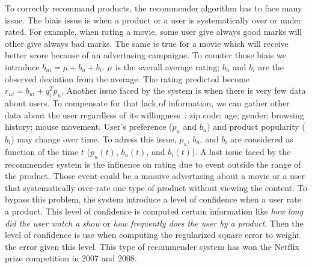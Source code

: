 \documentclass{article}
\begin{document}
To correctly recommand products, the recommender algorithm
has to face many issue. The biais issue is when a
product or a user is systematically over or under
rated. For example, when rating a movie, some user
give always good marks will other give always bad
marks. The same is true for a movie which will
receive better score because of an advertasing
campaigne. To counter those biais we introduce
$b_{ui} = \mu + b_{u} + b_{i}$. $\mu$ is the
overall average rating; $b_{u}$ and $b_{i}$ are
the observed deviation from the average. The
rating predicted become $r_{ui} = b_{ui} + q_{i}^{T} p_{u}$.
Another issue faced by the system is when there is
very few data about users. To compensate for that
lack of information, we can gather other
data about the user regardless of its
willingness~: zip code; age; gender; browsing
history; mouse movement.
User's preference ($p_{u}$ and $b_{u}$) and
product popularity ($b_{i}$) may change over
time. To adress this issue, $p_{u}$, $b_{u}$, and
$b_{i}$ are considered as function of the time
$t$ ($p_{u}(t)$, $b_{u}(t)$, and $b_{i}(t)$).
A last issue faced by the recommender system is
the influence on rating due to event outside the
range of the product. Those event could be a massive
advertasing about a movie or a user that
systematically over-rate one type of product
without viewing the content. To bypass this
problem, the system introduce a level of
confidence when a user rate a product. This level
of confidence is computed certain information like
\textit{how long did the user watch a show}
or \textit{how frequently does the user by a
product}. Then the level of confidence is use 
when computing the regularized square error to
weight the error given this level.
This type of recommender system has won the Netflix
prize competition in 2007 and 2008. 
\end{document}
